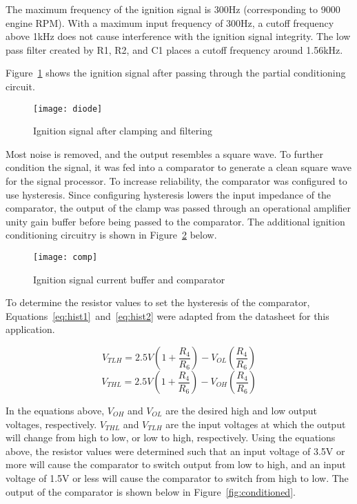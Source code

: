 The maximum frequency of the ignition signal is 300Hz (corresponding to 9000 engine RPM). With a maximum input frequency of 300Hz, a cutoff frequency above 1kHz does not cause interference with the ignition signal integrity. The low pass filter created by R1, R2, and C1 places a cutoff frequency around 1.56kHz.

Figure~\ref{fig:diode} shows the ignition signal after passing through the partial conditioning circuit.
\begin{figure}[H]
    \centering
    \texttt{[image: diode]}
    \caption{Ignition signal after clamping and filtering}
    \label{fig:diode}
\end{figure}

Most noise is removed, and the output resembles a square wave. To further condition the signal, it was fed into a comparator to generate a clean square wave for the signal processor. To increase reliability, the comparator was configured to use hysteresis. Since configuring hysteresis lowers the input impedance of the comparator, the output of the clamp was passed through an operational amplifier unity gain buffer before being passed to the comparator. The additional ignition conditioning circuitry is shown in Figure~\ref{fig:comp} below.

\begin{figure}[H]
    \centering
    \texttt{[image: comp]}
    \caption{Ignition signal current buffer and comparator}
    \label{fig:comp}
\end{figure}

To determine the resistor values to set the hysteresis of the comparator,  Equations~\ref{eq:hist1}~and~\ref{eq:hist2} were adapted from the datasheet\cite{mcp6541} for this application.

\begin{equation}
\label{eq:hist1}
    V_{TLH} = 2.5V(1+\frac{R_4}{R_6}) - V_{OL}(\frac{R_4}{R_6})
\end{equation}
\begin{equation}
\label{eq:hist2}
    V_{THL} = 2.5V(1+\frac{R_4}{R_6}) - V_{OH}(\frac{R_4}{R_6})
\end{equation}

In the equations above, $V_{OH}$ and $V_{OL}$ are the desired high and low output voltages, respectively. $V_{THL}$ and $V_{TLH}$ are the input voltages at which the output will change from high to low, or low to high, respectively. Using the equations above, the resistor values were determined such that an input voltage of 3.5V or more will cause the comparator to switch output from low to high, and an input voltage of 1.5V or less will cause the comparator to switch from high to low. The output of the comparator is shown below in Figure~\ref{fig:conditioned}.

